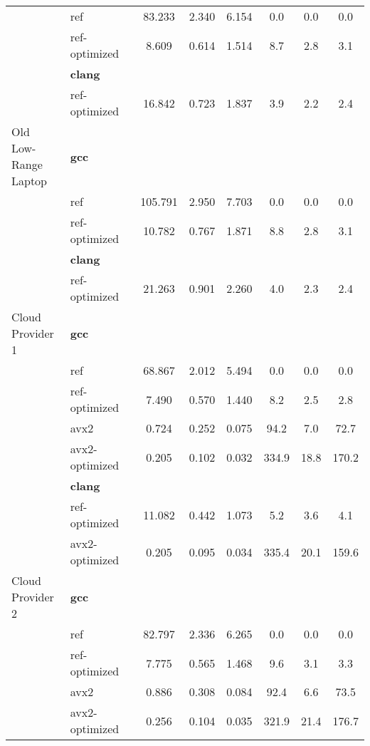 \begin{table}[H]
\begin{tabularx}{\linewidth}{l l c c c c c c}
          & ref & 83.233 & 2.340 & 6.154 & 0.0 & 0.0 & 0.0\\
          & ref-optimized & 8.609 & 0.614 & 1.514 & 8.7 & 2.8 & 3.1\\
          & \textbf{clang} & & & & & \\
          & ref-optimized & 16.842 & 0.723 & 1.837 & 3.9 & 2.2 & 2.4\\
          \midrule
          \multirowcell{5}{Old\\ Low-Range\\ Laptop}
          & \textbf{gcc} & & & & & \\
          & ref & 105.791 & 2.950 & 7.703 & 0.0 & 0.0 & 0.0\\
          & ref-optimized & 10.782 & 0.767 & 1.871 & 8.8 & 2.8 & 3.1\\
          & \textbf{clang} & & & & & \\
          & ref-optimized & 21.263 & 0.901 & 2.260 & 4.0 & 2.3 & 2.4\\
          \midrule
          \multirowcell{8}{Cloud\\ Provider\\ 1}
          & \textbf{gcc} & & & & & \\
          & ref & 68.867 & 2.012 & 5.494 & 0.0 & 0.0 & 0.0\\
          & ref-optimized & 7.490 & 0.570 & 1.440 & 8.2 & 2.5 & 2.8\\
          & avx2 & 0.724 & 0.252 & 0.075 & 94.2 & 7.0 & 72.7\\
          & avx2-optimized & 0.205 & 0.102 & 0.032 & 334.9 & 18.8 & 170.2\\
          & \textbf{clang} & & & & & \\
          & ref-optimized & 11.082 & 0.442 & 1.073 & 5.2 & 3.6 & 4.1\\
          & avx2-optimized & 0.205 & 0.095 & 0.034 & 335.4 & 20.1 & 159.6\\
          \midrule
          \multirowcell{8}{Cloud\\ Provider\\ 2}
          & \textbf{gcc} & & & & & \\
          & ref & 82.797 & 2.336 & 6.265 & 0.0 & 0.0 & 0.0\\
          & ref-optimized & 7.775 & 0.565 & 1.468 & 9.6 & 3.1 & 3.3\\
          & avx2 & 0.886 & 0.308 & 0.084 & 92.4 & 6.6 & 73.5\\
          & avx2-optimized & 0.256 & 0.104 & 0.035 & 321.9 & 21.4 & 176.7\\

\end{tabularx}
\end{table}

